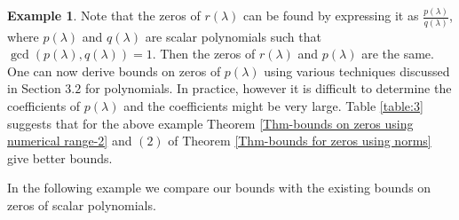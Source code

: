 \documentclass[12pt, reqno]{amsart}
\theoremstyle{definition}
\newtheorem{example}[theorem]{Example}
\theoremstyle{remark}
\numberwithin{equation}{section}
\begin{document}
\begin{example}
Note that the zeros of $r(\lambda)$ can be found by expressing it as
$\displaystyle \frac{p(\lambda)}{q(\lambda)}$, 
where $p(\lambda)$ and $q(\lambda)$ are scalar polynomials such that $\gcd(p(\lambda), 
q(\lambda))=1$. Then the zeros of $r(\lambda)$ and $p(\lambda)$ are the same. One 
can now derive bounds on zeros of $p(\lambda)$ using various techniques discussed 
in Section $3.2$ for polynomials. In practice, however it is difficult to determine 
the coefficients of $p(\lambda)$ and the coefficients might be very large. Table 
\ref{table:3} suggests that for the above example Theorem 
\ref{Thm-bounds on zeros using numerical range-2} and $(2)$ of Theorem 
\ref{Thm-bounds for zeros using norms} give better bounds.

\end{example}

\noindent
In the following example we compare our bounds with the existing bounds 
on zeros of scalar polynomials.
\end{document}
